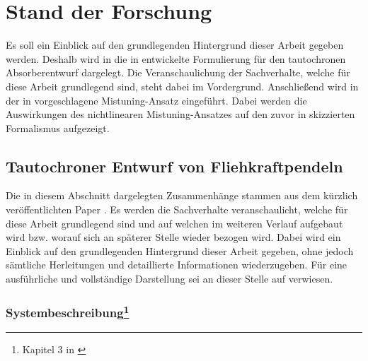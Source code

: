 \chapter{Stand der Forschung} \label{ch:StandDerForschung}

Es soll ein Einblick auf den grundlegenden Hintergrund dieser Arbeit gegeben werden.
Deshalb wird in  die in \cite{Mayet:Tautochronic} entwickelte Formulierung
für den tautochronen Absorberentwurf dargelegt. 
Die Veranschaulichung der Sachverhalte, welche für diese Arbeit
grundlegend sind, steht dabei im Vordergrund.
Anschließend wird in  der in \cite{Mayet:CPVAMitMistuning} vorgeschlagene
Mistuning-Ansatz eingeführt. Dabei werden die Auswirkungen des nichtlinearen
Mistuning-Ansatzes auf den zuvor in  skizzierten Formalismus aufgezeigt.


\section{Tautochroner Entwurf von Fliehkraftpendeln } 

\label{sec:TautochronerEntwurfAllgemein}


Die in diesem Abschnitt dargelegten Zusammenhänge stammen aus dem 
kürzlich veröffentlichten Paper \cite{Mayet:Tautochronic}.
Es werden die Sachverhalte veranschaulicht, welche für diese Arbeit
grundlegend sind und auf welchen im weiteren Verlauf aufgebaut wird bzw.
worauf sich an späterer Stelle wieder bezogen wird.
Dabei wird ein Einblick auf den grundlegenden Hintergrund dieser Arbeit gegeben,
ohne jedoch sämtliche Herleitungen und detaillierte Informationen wiederzugeben.
Für eine ausführliche und vollständige Darstellung sei an dieser Stelle
auf  \cite{Mayet:Tautochronic} verwiesen.











\subsection[Systembeschreibung]{Systembeschreibung\footnote{Kapitel 3 in \cite{Mayet:Tautochronic}}}


\label{subsec:Systembeschreibung}




